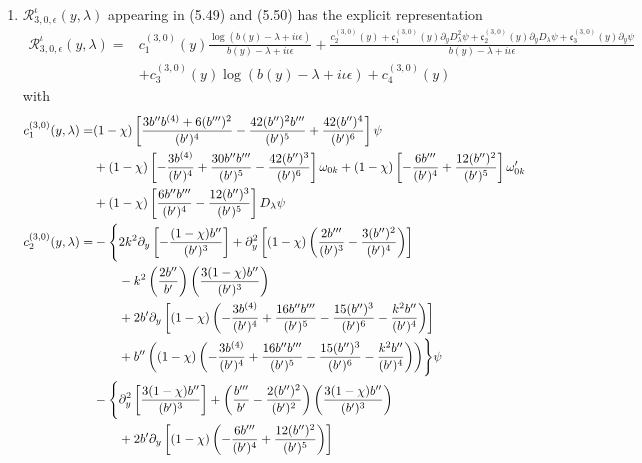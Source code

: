 \documentclass[reqno,11pt]{amsart}
\numberwithin{equation}{section}
\numberwithin{equation}{section} %
\begin{document}
\begin{enumerate}
\item $\mathcal{R}^\iota_{3,0,\epsilon}(y,\lambda)$ appearing in (5.49) and (5.50) has the explicit representation
\begin{equation}\label{ndR30}
    \begin{split}
        \mathcal{R}^\iota_{3,0,\epsilon}(y,\lambda)=&c_1^{(3,0)}(y)\frac{\log(b(y)-\lambda+i\iota\epsilon)}{b(y)-\lambda+i\iota\epsilon}+\frac{c_2^{(3,0)}(y)+\mathfrak{c}_1^{(3,0)}(y)\partial_yD_\lambda^2\psi+\mathfrak{c}_2^{(3,0)}(y)\partial_yD_\lambda\psi+\mathfrak{c}_3^{(3,0)}(y)\partial_y\psi}{b(y)-\lambda+i\iota\epsilon}\\
        &+c_3^{(3,0)}(y)\log(b(y)-\lambda+i\iota\epsilon)+c_4^{(3,0)}(y)
    \end{split}
\end{equation}
with 
\begin{align}
  c_1^{(3,0)}(y,\lambda)=&(1-\chi)\left[\frac{3b''b^{(4)}+6(b''')^2}{(b')^4}-\frac{42(b'')^2b'''}{(b')^5}+\frac{42(b'')^4}{(b')^6}\right]\psi \notag\\
       &+(1-\chi)\left[-\frac{3b^{(4)}}{(b')^4}
       +\frac{30b''b'''}{(b')^5}
       -\frac{42(b'')^3}{(b')^6}\right]\omega_{0k}+(1-\chi)\left[-\frac{6b'''}{(b')^4}
       +\frac{12(b'')^2}{(b')^5}\right]\omega_{0k}' \notag\\
       &+(1-\chi)\left[\frac{6b''b'''}{(b')^4}-\frac{12(b'')^3}{(b')^5}\right]D_\lambda\psi \notag\\
  c_2^{(3,0)}(y,\lambda)=&-\Biggl\{2k^2\partial_y\left[-\frac{(1-\chi)b''}{(b')^3}\right]+\partial_y^2\left[(1-\chi)\left(\frac{2b'''}{(b')^3}-\frac{3(b'')^2}{(b')^4}\right)\right] \notag\\
 &\qquad-k^2\left(\frac{2b''}{b'}\right)\left(\frac{3(1-\chi)b''}{(b')^3}\right) \notag\\
 &\qquad+2b'\partial_y\left[(1-\chi)\left(-\frac{3b^{(4)}}{(b')^4}+\frac{16b''b'''}{(b')^5}-\frac{15(b'')^3}{(b')^6}-\frac{k^2b''}{(b')^4}\right)\right] \notag\\
 &\qquad+b''\left((1-\chi)\left(-\frac{3b^{(4)}}{(b')^4}+\frac{16b''b'''}{(b')^5}-\frac{15(b'')^3}{(b')^6}-\frac{k^2b''}{(b')^4}\right)\right)\Biggr\}\psi \notag\\
 &-\Biggl\{\partial_y^2\left[\frac{3(1-\chi)b''}{(b')^3}\right]+\left(\frac{b'''}{b'}-\frac{2(b'')^2}{(b')^2}\right)\left(\frac{3(1-\chi)b''}{(b')^3}\right) \notag\\
 &\qquad+2b'\partial_y\left[(1-\chi)\left(-\frac{6b'''}{(b')^4}+\frac{12(b'')^2}{(b')^5}\right)\right] \notag\\

\end{align}
\end{enumerate}
\end{document}
